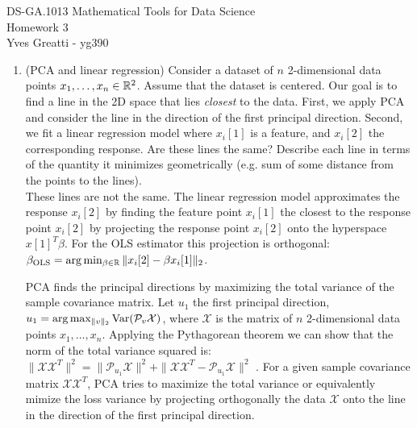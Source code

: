 \documentclass[12pt,twoside]{article}
\begin{document}
\noindent DS-GA.1013 Mathematical Tools for Data Science \\
Homework 3 \\
Yves Greatti - yg390\\

\begin{enumerate}
\item (PCA and linear regression) Consider a dataset of $n$ 2-dimensional data points $x_1,\ldots,x_n \in \mathbb{R}^2$. Assume that the dataset is centered. Our goal is to find a line in the 2D space that lies \emph{closest} to the data. First, we apply PCA and consider the line in the direction of the first principal direction. Second, we fit a linear regression model where $x_i[1]$ is a feature, and $x_i[2]$ the corresponding response. Are these lines the same? Describe each line in terms of the quantity it minimizes geometrically (e.g. sum of some distance from the points to the lines).\\

	These lines are not the same. The linear regression model approximates the response $x_i[2]$ by  finding the feature point  $x_i[1]$  the closest to the response point $x_i[2]$ by projecting the response point $x_i[2]$
	onto the hyperspace $x[1]^T \beta $. For the OLS estimator this projection is orthogonal: $\beta_{\text{OLS}} =  \arg \min_{\beta \in \mathbb{R}} \| x_i[2] - \beta x_i[1] \|_2$.
	
	PCA finds the principal directions by maximizing the total variance of the sample covariance matrix.
	Let $u_1$ the first principal direction, $u_1 = \arg \max_{\|v\|_2} \var(\mathcal{P}_v \mathcal{X})$, where $ \mathcal{X}$ is the matrix of $n$ 2-dimensional data points $x_1,\ldots,x_n$. 
	Applying the Pythagorean theorem we can show that the norm of the total variance squared is: 
	$\|\mathcal{X} \mathcal{X}^T\|^2 = \| \mathcal{P}_{u_1}\mathcal{X}\|^2 + \| \mathcal{X} \mathcal{X}^T - \mathcal{P}_{u_1}\mathcal{X} \|^2$ .
	For a given sample covariance  matrix $\mathcal{X} \mathcal{X}^T$, PCA tries to maximize the total variance or equivalently mimize the loss variance by projecting orthogonally the data  $\mathcal{X}$ onto the  line  in the direction of the first principal direction.
	


\end{enumerate}
\end{document}
